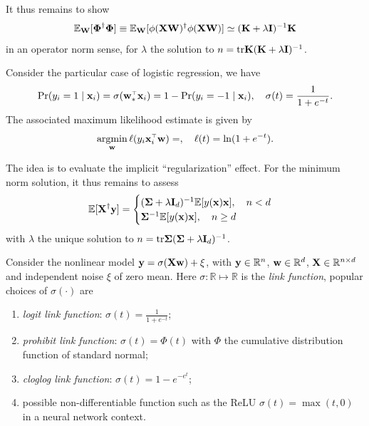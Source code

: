 \documentclass[11pt]{article}
\newcommand{\bPhi}{\boldsymbol{\Phi}}
\begin{document}
It thus remains to show
\[
  \E_\W[\bPhi^\dagger \bPhi] \equiv \E_\W[\phi(\X \W)^\dagger \phi(\X \W)] \simeq (\K + \lambda \I)^{-1} \K
\]
in an operator norm sense, for $\lambda$ the solution to $n = \mathrm{tr} \mathbf K (\mathbf K + \lambda \mathbf I)^{-1}$.

Consider the particular case of logistic regression, we have 
\[
  \Pr(y_i = 1 \mid \x_i) = \sigma(\w_*^\top \x_i) = 1 - \Pr(y_i = -1 \mid \x_i), \quad \sigma(t) = \frac1{1 + e^{-t}}.
\]
The associated maximum likelihood estimate is given by 
\[
  \argmin_\w \ell(y_i \x_i^\top \w) = , \quad \ell(t) = \ln(1 + e^{-t}).
\]

The idea is to evaluate the implicit ``regularization'' effect. For the minimum norm solution, it thus remains to assess
\begin{equation}\label{eq:implicit-regularization}
  \mathbb E[ \mathbf X^\dagger \mathbf y] = \begin{cases} (\mathbf{\Sigma} + \lambda \mathbf I_d)^{-1} \mathbb E[y(\mathbf x) \mathbf x], \quad n < d \\ \mathbf{\Sigma}^{-1} \mathbb E[y(\mathbf x) \mathbf x], \quad n \ge d \end{cases}
\end{equation}
with $\lambda$ the unique solution to $n = \mathrm{tr} \mathbf{\Sigma} (\mathbf{\Sigma}+ \lambda \mathbf I_d)^{-1}$.

Consider the nonlinear model $\mathbf y = \sigma(\mathbf X \mathbf w) + \xi$, with $\mathbf y \in \mathbb R^n$, $\mathbf w \in \mathbb R^d$, $\mathbf X \in \mathbb R^{n \times d}$ and independent noise $\xi$ of zero mean. Here $\sigma: \mathbb R \mapsto \mathbb R$ is the \emph{link function}, popular choices of $\sigma(\cdot)$ are
\begin{enumerate}
  \item \emph{logit link function}: $\sigma(t) = \frac1{ 1 + e^{-t} }$;
  \item \emph{prohibit link function}: $\sigma(t) = \Phi(t)$ with $\Phi$ the cumulative distribution function of standard normal;
  \item \emph{cloglog link function}: $\sigma(t) = 1 - e^{-e^t}$;
  \item possible non-differentiable function such as the ReLU $\sigma(t) = \max(t,0)$ in a neural network context.
\end{enumerate}
\end{document}

